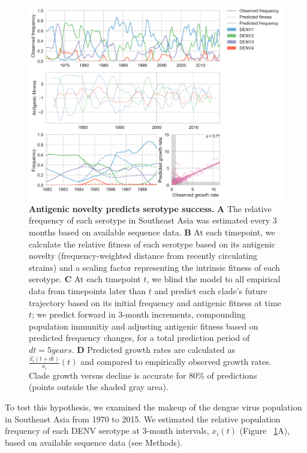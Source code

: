 \documentclass[11pt,oneside,letterpaper]{article}
\begin{document}
\begin{figure}[h]
  \begin{centering}
    \includegraphics[width=\linewidth]{../figures/png/serotype_fitness_model.png}
  	\caption{\textbf{Antigenic novelty predicts serotype success.}  \textbf{A} The relative frequency of each serotype in Southeast Asia was estimated every 3 months based on available sequence data. \textbf{B} At each timepoint, we calculate the relative fitness of each serotype based on its antigenic novelty (frequency-weighted distance from recently circulating strains) and a scaling factor representing the intrinsic fitness of each serotype. \textbf{C} At each timepoint $t$, we blind the model to all empirical data from timepoints later than $t$ and predict each clade's future trajectory based on its initial frequency and antigenic fitness at time $t$; we predict forward in 3-month increments, compounding population immunitiy and adjusting antigenic fitness based on predicted frequency changes, for a total prediction period of $dt = 5 years$. \textbf{D} Predicted growth rates are calculated as $\frac{\hat{x_i}(t+dt)}{x_i}(t)$ and compared to empirically observed growth rates. Clade growth versus decline is accurate for 80\% of predictions (points outside the shaded gray area).}
  	\label{serotype_fitness_model}
  \end{centering}
\end{figure}

To test this hypothesis, we examined the makeup of the dengue virus population in Southeast Asia from 1970 to 2015.
We estimated the relative population frequency of each DENV serotype at 3-month intervals, $x_i(t)$ (Figure ~\ref{serotype_fitness_model}A), based on available sequence data (see Methods).
\end{document}
